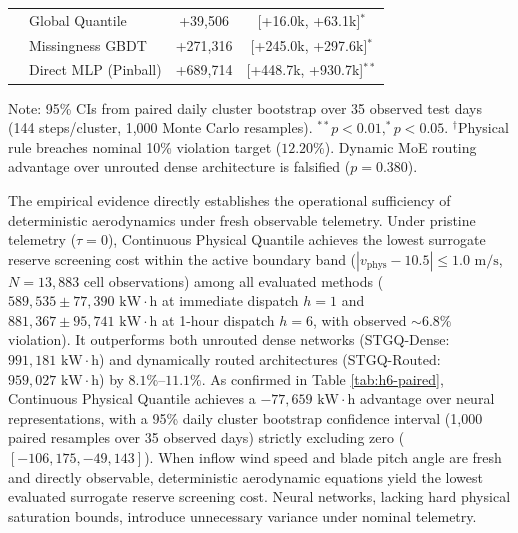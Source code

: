 \documentclass[
  journal]{IEEEtran}
\begin{document}
\begin{table}[!htbp]
\begin{tabular*}{\columnwidth}{@{\extracolsep{\fill}}llcc@{}}
 & Global Quantile & +39,506 & [+16.0k, +63.1k]$^{\ast}$ \\
 & Missingness GBDT & +271,316 & [+245.0k, +297.6k]$^{\ast}$ \\
 & Direct MLP (Pinball) & +689,714 & [+448.7k, +930.7k]$^{\ast\ast}$ \\
\bottomrule
\end{tabular*}
\vspace{1mm}
\raggedright\fontsize{8.0pt}{8.8pt}\selectfont Note: 95\% CIs from paired daily cluster bootstrap over 35 observed test days (144 steps/cluster, 1,000 Monte Carlo resamples). $^{\ast\ast}p<0.01, ^{\ast}p<0.05$. $^{\dagger}$Physical rule breaches nominal 10\% violation target ($12.20\%$). Dynamic MoE routing advantage over unrouted dense architecture is falsified ($p=0.380$).
\end{table}

The empirical evidence directly establishes the operational sufficiency
of deterministic aerodynamics under fresh observable telemetry. Under
pristine telemetry (\(\tau = 0\)), Continuous Physical Quantile achieves
the lowest surrogate reserve screening cost within the active boundary
band (\(|v_{\text{phys}}-10.5|\le 1.0\text{ m/s}\), \(N=13{,}883\) cell
observations) among all evaluated methods
(\(589{,}535 \pm 77{,}390\text{ kW}\cdot\text{h}\) at immediate dispatch
\(h=1\) and \(881{,}367 \pm 95{,}741\text{ kW}\cdot\text{h}\) at 1-hour
dispatch \(h=6\), with observed \(\sim 6.8\%\) violation). It
outperforms both unrouted dense networks (STGQ-Dense:
\(991{,}181\text{ kW}\cdot\text{h}\)) and dynamically routed
architectures (STGQ-Routed: \(959{,}027\text{ kW}\cdot\text{h}\)) by
\(8.1\%\text{--}11.1\%\). As confirmed in Table \ref{tab:h6-paired},
Continuous Physical Quantile achieves a
\(-77{,}659\text{ kW}\cdot\text{h}\) advantage over neural
representations, with a 95\% daily cluster bootstrap confidence interval
(1,000 paired resamples over 35 observed days) strictly excluding zero
(\([-106{,}175, -49{,}143]\)). When inflow wind speed and blade pitch
angle are fresh and directly observable, deterministic aerodynamic
equations yield the lowest evaluated surrogate reserve screening cost.
Neural networks, lacking hard physical saturation bounds, introduce
unnecessary variance under nominal telemetry.
\end{document}
